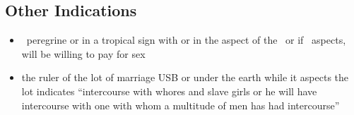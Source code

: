 \subsection{Other Indications}
\begin{itemize}
\item \Venus\, peregrine or in a tropical sign with or in the aspect of the \Moon\, or if \Saturn\, aspects, will be willing to pay for sex

\item the ruler of the lot of marriage USB or under the earth while it aspects the lot indicates ``intercourse with whores and slave girls or he will have intercourse with one with whom a multitude of men has had intercourse''

\end{itemize}
